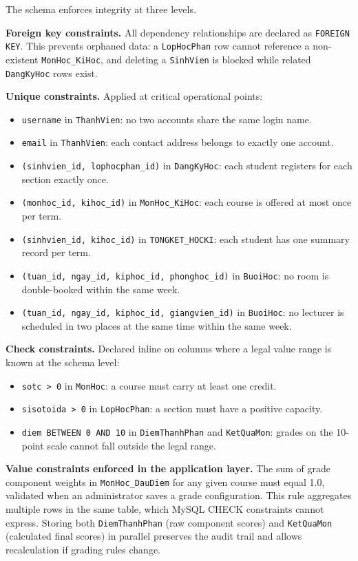 \documentclass[12pt,a4paper]{report}
\begin{document}
The schema enforces integrity at three levels.

\textbf{Foreign key constraints.} All dependency relationships are declared as \texttt{FOREIGN KEY}. This prevents orphaned data: a \texttt{LopHocPhan} row cannot reference a non-existent \texttt{MonHoc\_KiHoc}, and deleting a \texttt{SinhVien} is blocked while related \texttt{DangKyHoc} rows exist.

\textbf{Unique constraints.} Applied at critical operational points:

\begin{itemize}
  \item \texttt{username} in \texttt{ThanhVien}: no two accounts share the same login name.
  \item \texttt{email} in \texttt{ThanhVien}: each contact address belongs to exactly one account.
  \item \texttt{(sinhvien\_id, lophocphan\_id)} in \texttt{DangKyHoc}: each student registers for each section exactly once.
  \item \texttt{(monhoc\_id, kihoc\_id)} in \texttt{MonHoc\_KiHoc}: each course is offered at most once per term.
  \item \texttt{(sinhvien\_id, kihoc\_id)} in \texttt{TONGKET\_HOCKI}: each student has one summary record per term.
  \item \texttt{(tuan\_id, ngay\_id, kiphoc\_id, phonghoc\_id)} in \texttt{BuoiHoc}: no room is double-booked within the same week.
  \item \texttt{(tuan\_id, ngay\_id, kiphoc\_id, giangvien\_id)} in \texttt{BuoiHoc}: no lecturer is scheduled in two places at the same time within the same week.
\end{itemize}

\textbf{Check constraints.} Declared inline on columns where a legal value range is known at the schema level:

\begin{itemize}
  \item \texttt{sotc > 0} in \texttt{MonHoc}: a course must carry at least one credit.
  \item \texttt{sisotoida > 0} in \texttt{LopHocPhan}: a section must have a positive capacity.
  \item \texttt{diem BETWEEN 0 AND 10} in \texttt{DiemThanhPhan} and \texttt{KetQuaMon}: grades on the 10-point scale cannot fall outside the legal range.
\end{itemize}

\textbf{Value constraints enforced in the application layer.} The sum of grade component weights in \texttt{MonHoc\_DauDiem} for any given course must equal 1.0, validated when an administrator saves a grade configuration. This rule aggregates multiple rows in the same table, which MySQL CHECK constraints cannot express. Storing both \texttt{DiemThanhPhan} (raw component scores) and \texttt{KetQuaMon} (calculated final scores) in parallel preserves the audit trail and allows recalculation if grading rules change.
\end{document}
